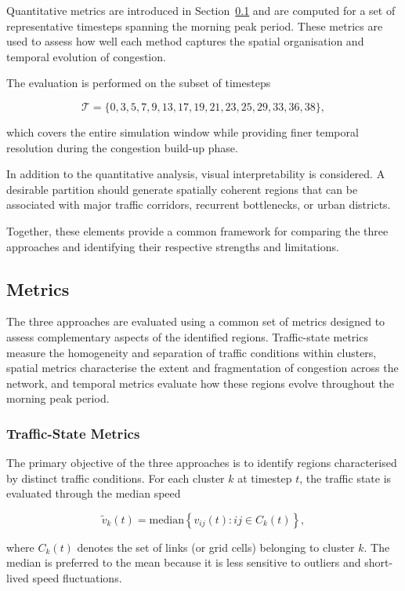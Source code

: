 \documentclass[11pt,a4paper]{article}
\begin{document}
Quantitative metrics are introduced in
Section~\ref{sec:eval:metrics} and are computed for a set of representative
timesteps spanning the morning peak period. These metrics are used to assess
how well each method captures the spatial organisation and temporal evolution
of congestion.

The evaluation is performed on the subset of timesteps

\[
\mathcal{T}
=
\{0,3,5,7,9,13,17,19,21,23,25,29,33,36,38\},
\]

which covers the entire simulation window while providing finer temporal
resolution during the congestion build-up phase.

In addition to the quantitative analysis, visual interpretability is
considered. A desirable partition should generate spatially coherent regions
that can be associated with major traffic corridors, recurrent bottlenecks,
or urban districts.

Together, these elements provide a common framework for comparing the three
approaches and identifying their respective strengths and limitations.

\subsection{Metrics}
\label{sec:eval:metrics}

The three approaches are evaluated using a common set of metrics designed to
assess complementary aspects of the identified regions. Traffic-state metrics
measure the homogeneity and separation of traffic conditions within clusters,
spatial metrics characterise the extent and fragmentation of congestion across
the network, and temporal metrics evaluate how these regions evolve throughout
the morning peak period.


\subsubsection{Traffic-State Metrics}

The primary objective of the three approaches is to identify regions
characterised by distinct traffic conditions. For each cluster $k$ at
timestep $t$, the traffic state is evaluated through the median speed

\begin{equation}
\tilde{v}_k(t)
=
\mathrm{median}
\left\{
v_{ij}(t)
:
ij \in C_k(t)
\right\},
\end{equation}

where $C_k(t)$ denotes the set of links (or grid cells) belonging to cluster
$k$. The median is preferred to the mean because it is less sensitive to
outliers and short-lived speed fluctuations.
\end{document}
